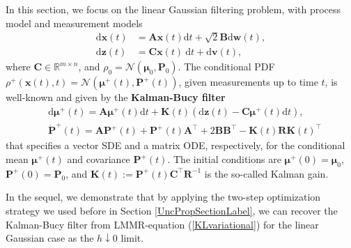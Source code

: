 \documentclass[letterpaper,10pt,twocolumn,conference]{ieeeconf}
\newcommand{\bbv}{\bm{v}}
\newcommand{\bbw}{\bm{w}}
\newcommand{\bbx}{{\bm{x}}}
\newcommand{\bbz}{\bm{z}}
\newcommand{\bbmu}{\bm{\mu}}
\newcommand{\bbP}{\bm{P}}
\newcommand{\bbK}{\bm{K}}
\newcommand{\bbR}{\bm{R}}
\newcommand{\bbA}{\bm{A}}
\newcommand{\bbB}{\bm{B}}
\newcommand{\bbC}{\bm{C}}
\begin{document}
In this section, we focus on the linear Gaussian filtering problem, with process model and measurement models
\begin{align*}
\mathrm{d}\bbx(t) &= \bbA\bbx(t)\mathrm{d}t + \sqrt{2}\bbB\mathrm{d}\bbw(t),\\
\mathrm{d}\bbz(t) &= \bbC\bm{x}(t)\:\mathrm{d}t + \mathrm{d}\bbv(t),
\end{align*}
where $\bbC\in\mathbb{R}^{m\times n}$, and $\rho_{0} = \mathcal{N}(\bbmu_{0},\bbP_{0})$. The conditional PDF $\rho^{+}(\bbx(t),t) = \mathcal{N}(\bbmu^{+}(t),\bbP^{+}(t))$, given measurements up to time $t$, is well-known and given by the \textbf{Kalman-Bucy filter} \cite{KalmanBucy1961}
\begin{subequations}\label{KalmanBucy}
\begin{align}
&\mathrm{d}\bbmu^{+}(t) = \bbA\bbmu^{+}(t)\mathrm{d}t + \bbK(t)\left(\mathrm{d}\bbz(t) - \bbC\bbmu^{+}(t)\mathrm{d}t\right), \label{eq:KB1}\\
& \! \!\dot{\bbP}^{+} \!(t)  \!=  \!\bbA\bbP^{+} \!(t) \!+  \!\! \bbP^{+} \!(t)\bbA^{\top}  \! \!+ \! 2\bbB\bbB^{\top}    \!\!\!-  \!\bbK \!(t)\bbR\bbK \!(t)^{\top} \label{eq:KB2}
\end{align}
\end{subequations}
that specifies a vector SDE and a matrix ODE, respectively, for 
 the conditional mean $\bbmu^{+}(t)$ and covariance $\bbP^{+}(t)$.
The initial conditions are $\bbmu^{+}(0) = \bbmu_{0}$, $\bbP^{+}(0) = \bbP_{0}$, and $\bbK(t) := \bbP^{+}(t)\bbC^{\top}\bbR^{-1}$ is the so-called Kalman gain.

In the sequel, we demonstrate that by applying the two-step optimization strategy we used before in Section \ref{UncPropSectionLabel}, we can recover the Kalman-Bucy filter from LMMR-equation (\ref{KLvariational}) for the linear Gaussian case as the $h\downarrow 0$ limit.
  
\end{document}
